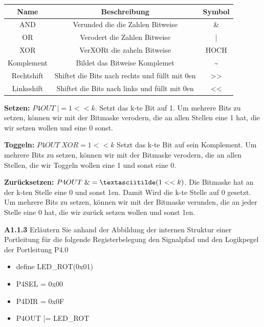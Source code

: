 \begin{description}
\begin{tabular}{c|c|c}
Name & Beschreibung & Symbol\\
\hline

AND & Verunded die die Zahlen Bitweise &  \&\\

OR & Verodert die Zahlen Bitweise & | \\

XOR &  VerXORt die zaheln Bitweise & HOCH \\

Komplement &  Bildet das Bitweise Komplemet & \textasciitilde \\

Rechtshift & Shiftet die Bits nach rechts und füllt mit 0en & >>\\

Linksshift & Shiftet die Bits nach links und füllt mit 0en & <<\\

\end{tabular}

\begin{description}

\item{\bfseries Setzen:} $P4OUT \; |= 1<< k$. Setzt das k-te Bit auf 1. Um mehrere Bits zu setzen, können wir mit der Bitmaske verodern, die an allen Stellen eine 1 hat, die wir setzen wollen und eine 0 sonst.

\item{\bfseries Toggeln:} $P4OUT \;  XOR= 1<<k$ Setzt das k-te Bit auf sein Komplement. Um mehrere Bits zu setzen, können wir mit der Bitmaske verodern, die an allen Stellen, die wir Toggeln wollen eine 1 und sonst eine 0.

\item{\bfseries Zurücksetzen:} $P4OUT \; \&= \textasciitilde (1<<k)$. Die Bitmaske hat an der k-ten Stelle eine 0 und sonst 1en. Damit Wird die k-te Stelle auf 0 gesetzt. Um mehrere Bits zu setzen, können wir mit der Bitmaske verunden, die an jeder Stelle eine 0 hat, die wir zurück setzen wollen und sonst 1en.

\end{description}

\item{\bfseries A1.1.3} Erläutern Sie anhand der Abbildung der internen Struktur einer Portleitung für die folgende Registerbelegung den Signalpfad und den Logikpegel der Portleitung P4.0

\begin{itemize}
\item define LED\_ROT(0x01)
\item P4SEL = 0x00
\item P4DIR = 0x0F
\item P4OUT |= LED\_ROT


\end{itemize}
\end{description}
